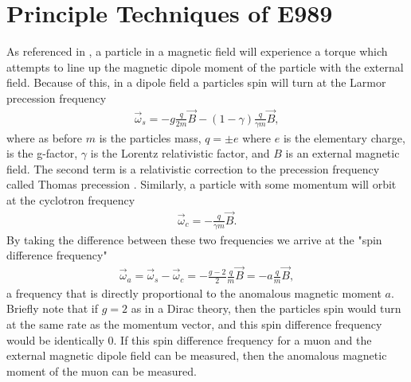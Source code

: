 
\thispagestyle{myheadings}

\graphicspath{{Body/Figures/ExperimentalOverview/Decay/}{Body/Figures/TrackingFigures/TrackerPics/}{Body/Figures/ExperimentalOverview/Ring/}{Body/Figures/ExperimentalOverview/Accelerator/}{Body/Figures/ExperimentalOverview/Beam/}{Body/Figures/ExperimentalOverview/Auxiliary/}{Body/Figures/MagneticField/}}

\chapter{Principle Techniques of E989}
\label{chapter:E989}

As referenced in , a particle in a magnetic field will experience a torque which attempts to line up the magnetic dipole moment of the particle with the external field. Because of this, in a dipole field a particles spin will turn at the Larmor precession frequency \cite{Jackson}
        \begin{align} \label{eq:ws}
            \vec{\omega}_{s} = -g\frac{q}{2m}\vec{B} - (1-\gamma)\frac{q}{\gamma m}\vec{B},
        \end{align}
where as before $m$ is the particles mass, $q = \pm e$ where $e$ is the elementary charge, \g is the g-factor, $\gamma$ is the Lorentz relativistic factor, and $B$ is an external magnetic field. The second term is a relativistic correction to the precession frequency called Thomas precession \cite{Jackson}. Similarly, a particle with some momentum will orbit at the cyclotron frequency
        \begin{align} \label{eq:wc}
            \vec{\omega}_{c} = -\frac{q}{\gamma m}\vec{B}.
        \end{align}
By taking the difference between these two frequencies we arrive at the "spin difference frequency"
        \begin{align} \label{eq:wasimple}
            \vec{\omega}_{a} = \vec{\omega}_{s} - \vec{\omega}_{c} = -\frac{g-2}{2}\frac{q}{m}\vec{B} = - a \frac{q}{m}\vec{B},
        \end{align}
a frequency that is directly proportional to the anomalous magnetic moment $a$. Briefly note that if $g = 2$ as in a Dirac theory, then the particles spin would turn at the same rate as the momentum vector, and this spin difference frequency \wa would be identically 0. If this spin difference frequency for a muon and the external magnetic dipole field can be measured, then the anomalous magnetic moment of the muon \amu can be measured. 

